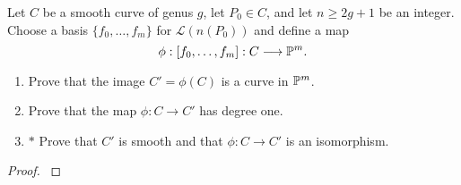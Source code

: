 \documentclass[12pt,reqno]{amsart}
\begin{document}
\begin{exe}\label{3.6}
Let $C$ be a smooth curve of genus $g$, let $P_0\in C$, and let $n \geq 2g+1$ be an integer.  Choose a basis $\{f_0, \hdots, f_m\}$ for $\mathcal{L}\left(n(P_0)\right)$ and define a map
\[
\phi: [f_0,\hdots, f_m]: C \longrightarrow {\mathbb P}^m.
\]
\begin{enumerate}
\item
Prove that the image $C'=\phi(C)$ is a curve in ${\mathbb P}^m$.
\item
Prove that the map $\phi: C \longrightarrow C'$ has degree one.
\item
$\ast$ Prove that $C'$ is smooth and that $\phi: C \longrightarrow C'$ is an isomorphism.
\end{enumerate}
\begin{proof}\label{s3.6}

\end{proof} 
\end{exe} 
\end{document}
